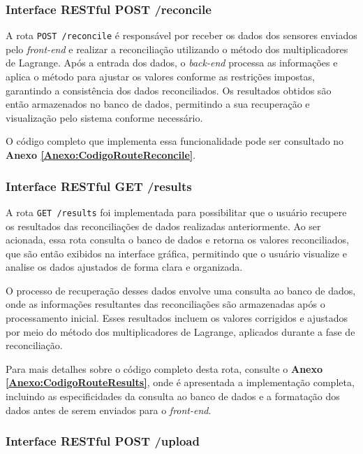 \subsubsection{Interface RESTful POST /reconcile}

A rota \texttt{POST /reconcile} é responsável por receber os dados dos sensores enviados pelo \textit{front-end} e realizar a reconciliação utilizando o método dos multiplicadores de Lagrange. Após a entrada dos dados, o \textit{back-end} processa as informações e aplica o método para ajustar os valores conforme as restrições impostas, garantindo a consistência dos dados reconciliados. Os resultados obtidos são então armazenados no banco de dados, permitindo a sua recuperação e visualização pelo sistema conforme necessário.

O código completo que implementa essa funcionalidade pode ser consultado no \textbf{Anexo \ref{Anexo:CodigoRouteReconcile}}.

\subsubsection{Interface RESTful GET /results}

A rota \texttt{GET /results} foi implementada para possibilitar que o usuário recupere os resultados das reconciliações de dados realizadas anteriormente. Ao ser acionada, essa rota consulta o banco de dados e retorna os valores reconciliados, que são então exibidos na interface gráfica, permitindo que o usuário visualize e analise os dados ajustados de forma clara e organizada.

O processo de recuperação desses dados envolve uma consulta ao banco de dados, onde as informações resultantes das reconciliações são armazenadas após o processamento inicial. Esses resultados incluem os valores corrigidos e ajustados por meio do método dos multiplicadores de Lagrange, aplicados durante a fase de reconciliação.

Para mais detalhes sobre o código completo desta rota, consulte o \textbf{Anexo \ref{Anexo:CodigoRouteResults}}, onde é apresentada a implementação completa, incluindo as especificidades da consulta ao banco de dados e a formatação dos dados antes de serem enviados para o \textit{front-end}.

\subsubsection{Interface RESTful POST /upload}

